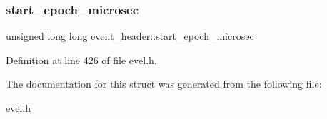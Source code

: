 \subsubsection{\texorpdfstring{start\+\_\+epoch\+\_\+microsec}{start\_epoch\_microsec}}
{\footnotesize\ttfamily unsigned long long event\+\_\+header\+::start\+\_\+epoch\+\_\+microsec}



Definition at line 426 of file evel.\+h.



The documentation for this struct was generated from the following file\+:\begin{DoxyCompactItemize}
\item 
\hyperlink{evel_8h}{evel.\+h}\end{DoxyCompactItemize}
